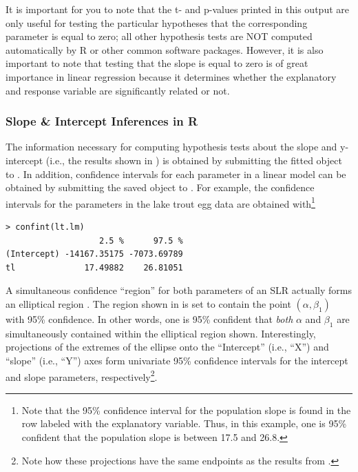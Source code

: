 \documentclass[10pt,openany]{book}\usepackage[]{graphicx}\usepackage[]{color}
\makeatletter
\newenvironment{kframe}{%
 \def\at@end@of@kframe{}%
 \ifinner\ifhmode%
  \def\at@end@of@kframe{\end{minipage}}%
  \begin{minipage}{\columnwidth}%
 \fi\fi%
 \def\FrameCommand##1{\hskip\@totalleftmargin \hskip-\fboxsep
 \colorbox{shadecolor}{##1}\hskip-\fboxsep
     \hskip-\linewidth \hskip-\@totalleftmargin \hskip\columnwidth}%
 \MakeFramed {\advance\hsize-\width
   \@totalleftmargin\z@ \linewidth\hsize
   \@setminipage}}%
 {\par\unskip\endMakeFramed%
 \at@end@of@kframe}
\newenvironment{knitrout}{}{} %
\makeatother
\begin{document}
It is important for you to note that the t- and p-values printed in this output are only useful for testing the particular hypotheses that the corresponding parameter is equal to zero; all other hypothesis tests are NOT computed automatically by R or other common software packages.  However, it is also important to note that testing that the slope is equal to zero is of great importance in linear regression because it determines whether the explanatory and response variable are significantly related or not.


\vspace{-12pt}

\subsubsection{Slope \& Intercept Inferences in R}
The information necessary for computing hypothesis tests about the slope and y-intercept (i.e., the results shown in ) is obtained by submitting the fitted  object to .  In addition, confidence intervals for each parameter in a linear model can be obtained by submitting the saved  object to .  For example, the confidence intervals for the parameters in the lake trout egg data are obtained with\footnote{Note that the 95\% confidence interval for the population slope is found in the row labeled with the explanatory variable.  Thus, in this example, one is 95\% confident that the population slope is between 17.5 and 26.8.}

\begin{knitrout}
\color{fgcolor}\begin{kframe}
\begin{verbatim}
> confint(lt.lm)
                   2.5 %      97.5 %
(Intercept) -14167.35175 -7073.69789
tl              17.49882    26.81051
\end{verbatim}
\end{kframe}
\end{knitrout}

A simultaneous confidence ``region'' for both parameters of an SLR actually forms an elliptical region .  The region shown in  is set to contain the point $(\alpha,\beta_{1})$ with 95\% confidence.  In other words, one is 95\% confident that \emph{both} $\alpha$ and $\beta_{1}$ are simultaneously contained within the elliptical region shown.  Interestingly, projections of the extremes of the ellipse onto the ``Intercept'' (i.e., ``X'') and ``slope'' (i.e., ``Y'') axes form univariate 95\% confidence intervals for the intercept and slope parameters, respectively\footnote{Note how these projections have the same endpoints as the results from .}.
\end{document}
